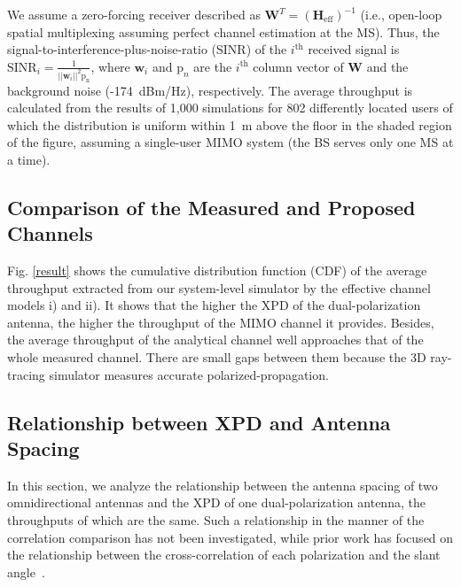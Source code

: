 \documentclass[journal]{IEEEtran}
\begin{document}
We assume a zero-forcing receiver described as $\pmb{W}^T = \left(\pmb{H}_\text{eff}\right)^{-1}$ (i.e., open-loop spatial multiplexing assuming perfect channel estimation at the MS). Thus, the signal-to-interference-plus-noise-ratio (SINR) of the $i^\text{th}$ received signal is $\text{SINR}_i=\frac{1}{||\pmb{w}_i||^2\text{p}_\text{n}}$, where $\pmb{w}_i$ and $\text{p}_n$ are the $i^\text{th}$ column vector of $\pmb{W}$ and the background noise (-174~dBm/Hz), respectively. The average throughput is calculated from the results of 1,000 simulations for 802 differently located users of which the distribution is uniform within 1~m above the floor in the shaded region of the figure, assuming a single-user MIMO system (the BS serves only one MS at a time).
\subsection{Comparison of the Measured and Proposed Channels}
Fig. \ref{result} shows the cumulative distribution function (CDF) of the average throughput extracted from our system-level simulator by the effective channel models i) and ii). It shows that the higher the XPD of the dual-polarization antenna, the higher the throughput of the MIMO channel it provides. Besides, the average throughput of the analytical channel well approaches that of the whole measured channel. There are small gaps between them because the 3D ray-tracing simulator measures accurate polarized-propagation.

\subsection{Relationship between XPD and Antenna Spacing}
In this section, we analyze the relationship between the antenna spacing of two omnidirectional antennas and the XPD of one dual-polarization antenna, the throughputs of which are the same.
Such a relationship in the manner of the correlation comparison has not been investigated, while prior work has focused on the relationship between the cross-correlation of each polarization and the slant angle~\cite{DP_WCM,3DDPchannel}. 
\end{document}
